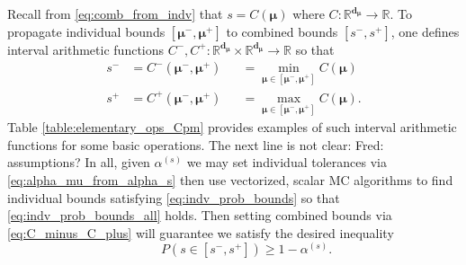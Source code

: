 \documentclass[graybox]{svmult}
\newcommand{\JRComment}[1]{{\color{violet}#1}}
\newcommand{\FJHComment}[1]{{\color{purple}Fred:  #1}}
\begin{document}
Recall from \eqref{eq:comb_from_indv} that $s = C(\boldsymbol{\mu})$ where $C: \mathbb{R}^{\boldsymbol{d}_{\boldsymbol{\mu}}} \to \mathbb{R}$. To propagate individual bounds $[\boldsymbol{\mu}^-,\boldsymbol{\mu}^+]$ to combined bounds $[s^-,s^+]$, one defines interval arithmetic \cite{interval_analysis} functions $C^-,C^+: \mathbb{R}^{\boldsymbol{d}_{\boldsymbol{\mu}}} \times \mathbb{R}^{\boldsymbol{d}_{\boldsymbol{\mu}}} \to \mathbb{R}$ so that
\begin{equation}
    \begin{aligned}
    s^- &= C^-(\boldsymbol{\mu}^-,\boldsymbol{\mu}^+) &&= \min_{\boldsymbol{\mu} \in [\boldsymbol{\mu}^-,\boldsymbol{\mu}^+]} C(\boldsymbol{\mu}) \\
    s^+ &= C^+(\boldsymbol{\mu}^-,\boldsymbol{\mu}^+) &&= \max_{\boldsymbol{\mu} \in [\boldsymbol{\mu}^-,\boldsymbol{\mu}^+]} C(\boldsymbol{\mu}).
    \end{aligned}
    \label{eq:C_minus_C_plus}
\end{equation}
Table \ref{table:elementary_ops_Cpm} provides examples of such interval arithmetic functions for some basic operations. \JRComment{The next line is not clear:} \FJHComment{assumptions?} In all, given $\alpha^{(s)}$ we may set individual tolerances via \eqref{eq:alpha_mu_from_alpha_s} then use vectorized, scalar MC algorithms to find individual bounds satisfying \eqref{eq:indv_prob_bounds} so that \eqref{eq:indv_prob_bounds_all} holds. Then setting combined bounds via \eqref{eq:C_minus_C_plus} will guarantee we satisfy the desired inequality
$$\qquad  P(s \in [s^-,s^+]) \geq 1-\alpha^{(s)}.$$
\end{document}
